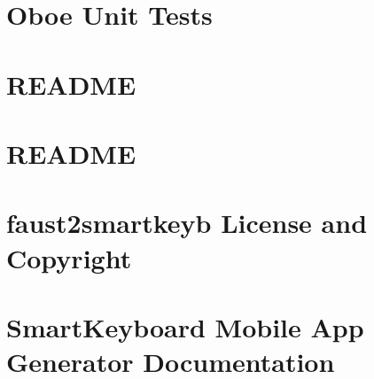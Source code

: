 \let\mypdfximage\pdfximage\def\pdfximage{\immediate\mypdfximage}\documentclass[twoside]{book}
\newcommand{\+}{\discretionary{\mbox{\scriptsize$\hookleftarrow$}}{}{}}
\begin{document}
\chapter{Oboe Unit Tests}
\label{md__c_1__users_fab_src__github_branches__neural_amp_modeler_plugin_i_plug2__dependencies__build_2e065d5eef4b4de4f8cbca0d3dffb320}

\chapter{R\+E\+A\+D\+ME}
\label{md__c_1__users_fab_src__github_branches__neural_amp_modeler_plugin_i_plug2__dependencies__build_a618e0eff4284fcec554660c4b8e7fc8}

\chapter{R\+E\+A\+D\+ME}
\label{md__c_1__users_fab_src__github_branches__neural_amp_modeler_plugin_i_plug2__dependencies__build_0bc4bf191668d456f1f71516c3071dcd}

\chapter{faust2smartkeyb License and Copyright}
\label{md__c_1__users_fab_src__github_branches__neural_amp_modeler_plugin_i_plug2__dependencies__build_6784cfeacb1fd2ae08c6a6f6e6c5c5ae}

\chapter{Smart\+Keyboard Mobile App Generator Documentation}
\label{md__c_1__users_fab_src__github_branches__neural_amp_modeler_plugin_i_plug2__dependencies__build_32b8e265a2d16024063f0e1fb7af73b6}

\end{document}
